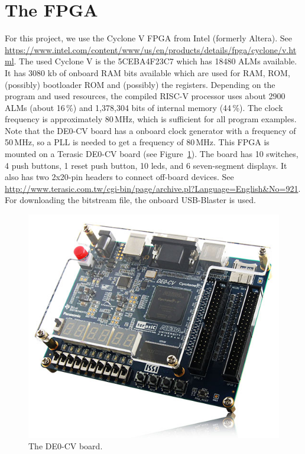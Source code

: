 \documentclass[12pt]{article}
\begin{document}
\section{The FPGA}
For this project, we use the Cyclone V FPGA from Intel (formerly Altera). See \url{https://www.intel.com/content/www/us/en/products/details/fpga/cyclone/v.html}.
The used Cyclone V is the 5CEBA4F23C7 which has 18480 ALMs available. It has 3080 kb of onboard RAM bits available which are used for RAM, ROM, (possibly) bootloader ROM and (possibly) the registers. Depending on the program and used resources, the compiled RISC-V processor uses about 2900 ALMs (about 16\,\%) and 1,378,304 bits of internal memory (44\,\%). The clock frequency is approximately 80\,MHz, which is sufficient for all program examples. Note that the DE0-CV board has a onboard clock generator with a frequency of 50\,MHz, so a PLL is needed to get a frequency of 80\,MHz. This FPGA is mounted on a Terasic DE0-CV board (see Figure~\ref{fig:image-de0-cv}). The board has 10 switches, 4 push buttons, 1 reset push button, 10 leds, and 6 seven-segment displays. It also has two 2x20-pin headers to connect off-board devices. See \url{http://www.terasic.com.tw/cgi-bin/page/archive.pl?Language=English&No=921}. For downloading the bitstream file, the onboard USB-Blaster is used.

\begin{figure}[!ht]
\centering
\includegraphics[scale=0.45]{images/image-de0-cv}
\caption{The DE0-CV board.}
\label{fig:image-de0-cv}
\end{figure}
\end{document}
